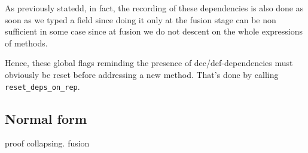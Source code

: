 \medskip
As previously statedd, in fact, the recording of these dependencies is
also done as soon as we typed a field since doing it only at the
fusion stage can be non sufficient in some case since at fusion we do
not descent on the whole expressions of methods.

\medskip
Hence, these global flags reminding the presence of
dec/def-dependencies must obviously be reset before addressing a
new method. That's done by calling {\tt reset\_deps\_on\_rep}.


\subsection{Normal form}
proof collapsing.
fusion
